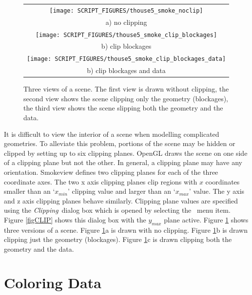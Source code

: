 \documentclass[11pt,twoside]{book}
\newcommand{\figoptions}{hbp}
\begin{document}
\begin{figure}[\figoptions]
\begin{center}
\begin{tabular}{c}
\texttt{[image: SCRIPT\_FIGURES/thouse5\_smoke\_noclip]}\\
a) no clipping\\
\texttt{[image: SCRIPT\_FIGURES/thouse5\_smoke\_clip\_blockages]}\\
b) clip blockages\\
\texttt{[image: SCRIPT\_FIGURES/thouse5\_smoke\_clip\_blockages\_data]}\\
b) clip blockages and data\\
\end{tabular}
\end{center}
\caption[Clipping a scene.]{Three views of a
scene. The first view is drawn without clipping, the second
view shows the scene clipping only the geometry (blockages), the third view
shows the scene slipping both the geometry and the data.}
\label{figCLIPPED}
\end{figure}

It is difficult to view the interior of a scene when modelling
complicated geometries.  To alleviate this problem, portions of
the scene may be hidden or clipped by setting up to six clipping
planes. OpenGL draws the scene on one side of a clipping plane but
not the other. In general, a clipping plane may have any
orientation. Smokeview defines two clipping planes for each of the
three coordinate axes.   The two x axis clipping planes clip
regions with $x$ coordinates smaller than an `$x_{min}$' clipping
value and larger than an `$x_{max}$' value. The y axis and z axis
clipping planes behave similarly.  Clipping plane values are
specified using the {\em Clipping}\ dialog box which is opened by
selecting the \ menu item. Figure
\ref{figCLIP} shows this dialog box with the $y_{max}$ plane active.
Figure \ref{figCLIPPED} shows three versions of a scene.
Figure \ref{figCLIPPED}a is drawn with no clipping.
Figure \ref{figCLIPPED}b is drawn clipping just the geometry (blockages).
Figure \ref{figCLIPPED}c is drawn clipping both the geometry and the data.

\chapter{Coloring Data}
\end{document}
